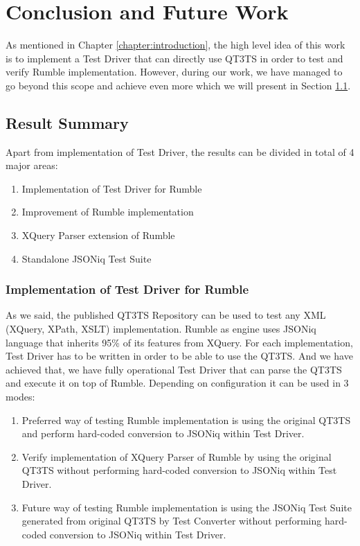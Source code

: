 \chapter{Conclusion and Future Work} 
\label{chapter:conclusions}
As mentioned in Chapter \ref{chapter:introduction}, the high level idea of this work is to implement a Test Driver that can directly use QT3TS in order to test and verify Rumble implementation. However, during our work, we have managed to go beyond this scope and achieve even more which we will present in Section \ref{sec:overallsummary}.

\section{Result Summary}
\label{sec:overallsummary}
Apart from implementation of Test Driver, the results can be divided in total of 4 major areas:
\begin{enumerate}
	\item Implementation of Test Driver for Rumble
	\item Improvement of Rumble implementation
	\item XQuery Parser extension of Rumble
	\item Standalone JSONiq Test Suite
\end{enumerate}

\subsection{Implementation of Test Driver for Rumble}
As we said, the published QT3TS Repository \cite{TestSuiteGitHubRepository} can be used to test any XML (XQuery, XPath, XSLT) implementation. Rumble as engine uses JSONiq language that inherits 95\% of its features from XQuery. For each implementation, Test Driver has to be written in order to be able to use the QT3TS. And we have achieved that, we have fully operational Test Driver that can parse the QT3TS and execute it on top of Rumble. Depending on configuration it can be used in 3 modes:
\begin{enumerate}
	\item Preferred way of testing Rumble implementation is using the original QT3TS and perform hard-coded conversion to JSONiq within Test Driver.
	\item  Verify implementation of XQuery Parser of Rumble by using the original QT3TS without performing hard-coded conversion to JSONiq within Test Driver.
	\item Future way of testing Rumble implementation is using the JSONiq Test Suite generated from original QT3TS by Test Converter without performing hard-coded conversion to JSONiq within Test Driver.
\end{enumerate} 

